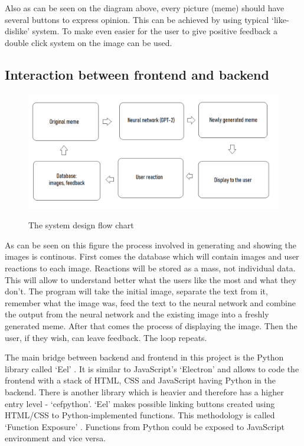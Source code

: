 \documentclass[12pt]{report}
\begin{document}
    Also as can be seen on the diagram above, every picture (meme) should have several buttons to express opinion. This can be achieved by using typical `like-dislike' system. To make even easier for the user to give positive feedback a double click system on the image can be used.
    
    \clearpage

    \subsection*{Interaction between frontend and backend}
    \paragraph{}

    \begin{figure}[h]
        \centering
        \includegraphics[scale=.5]{img/flow_diagram.png}
        \label{flow_diagram}
        \caption{The system design flow chart}
    \end{figure}

    As can be seen on this figure the process involved in generating and showing the images is continous. First comes the database which will contain images and user reactions to each image. Reactions will be stored as a mass, not individual data. This will allow to understand better what the users like the most and what they don't. 
    The program will take the initial image, separate the text from it, remember what the image was, feed the text to the neural network and combine the output from the neural network and the existing image into a freshly generated meme. After that comes the process of displaying the image. Then the user, if they wish, can leave feedback. The loop repeats.

    The main bridge between backend and frontend in this project is the Python library called `Eel' \citep{eel_github}. It is similar to JavaScript's `Electron' and allows to code the frontend with a stack of HTML, CSS and JavaScript having Python in the backend. There is another library which is heavier and therefore has a higher entry level - `cefpython'.
    `Eel' makes possible linking buttons created using HTML/CSS to Python-implemented functions. This methodology is called `Function Exposure' \citep{eel_github}. Functions from Python could be exposed to JavaScript environment and vice versa.
\end{document}
